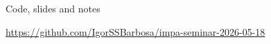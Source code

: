 \documentclass[10pt, aspectratio=169, xcolor={table}]{beamer}
\newcommand{\TODO}[1]{{\color{red}\textbf{[TODO]} #1}}
\renewcommand{\TODO}[1]{}
\begin{document}
\begin{frame}{Code, slides and notes}
  \begin{center}
    \large\url{https://github.com/IgorSSBarbosa/impa-seminar-2026-05-18}
  \end{center}

\end{frame}

\appendix

%
\end{document}
